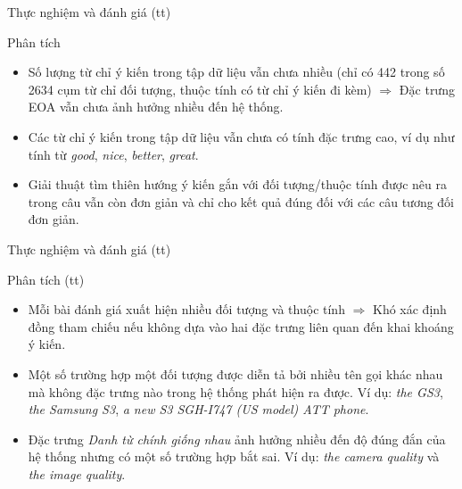 \documentclass[9pt,xcolor=table,hyperref=unicode]{beamer}
\begin{document}
		\begin{frame}{Thực nghiệm và đánh giá (tt)}
			\begin{block}{Phân tích}
				\begin{itemize}
					\item{Số lượng từ chỉ ý kiến trong tập dữ liệu vẫn chưa nhiều (chỉ có 442 trong số 2634 cụm từ chỉ đối tượng, thuộc tính có từ chỉ ý kiến đi kèm) $\Rightarrow$ Đặc trưng EOA vẫn chưa ảnh hưởng nhiều đến hệ thống.}
					\item{Các từ chỉ ý kiến trong tập dữ liệu vẫn chưa có tính đặc trưng cao, ví dụ như tính từ \textit{good}, \textit{nice}, \textit{better}, \textit{great}.}
					\item{Giải thuật tìm thiên hướng ý kiến gắn với đối tượng/thuộc tính được nêu ra trong câu vẫn còn đơn giản và chỉ cho kết quả đúng đối với các câu tương đối đơn giản.}
				\end{itemize}
			\end{block}
		\end{frame}

		\begin{frame}{Thực nghiệm và đánh giá (tt)}			
			\begin{block}{Phân tích (tt)}
				\begin{itemize}
					\item{Mỗi bài đánh giá xuất hiện nhiều đối tượng và thuộc tính $\Rightarrow$ Khó xác định đồng tham chiếu nếu không dựa vào hai đặc trưng liên quan đến khai khoáng ý kiến.}
					\item{Một số trường hợp một đối tượng được diễn tả bởi nhiều tên gọi khác nhau mà không đặc trưng nào trong hệ thống phát hiện ra được. Ví dụ: \textit{the GS3}, \textit{the Samsung S3}, \textit{a new S3 SGH-I747 (US model) ATT phone}.}
					\item{Đặc trưng \textit{Danh từ chính giống nhau} ảnh hưởng nhiều đến độ đúng đắn của hệ thống nhưng có một số trường hợp bắt sai. Ví dụ: \textit{the camera quality} và \textit{the image quality}.}
				\end{itemize}
			\end{block}
		\end{frame}
\end{document}
